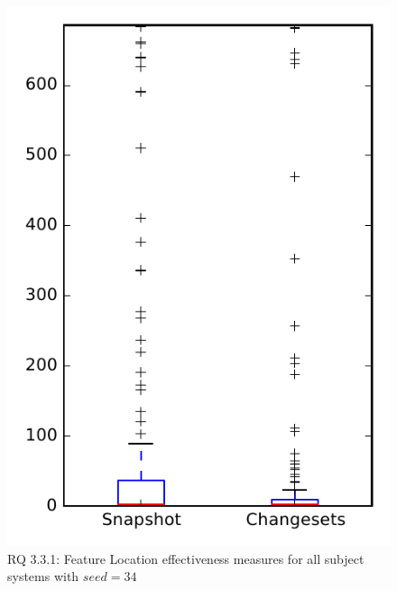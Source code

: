 
\begin{figure}
\centering
\includegraphics[height=0.4\textheight]{figures/flt_seed/rq1_overview_34}
\caption{RQ 3.3.1: Feature Location effectiveness measures for all subject systems with $seed=34$}
\label{fig:flt_seed:rq1:overview}
\end{figure}

